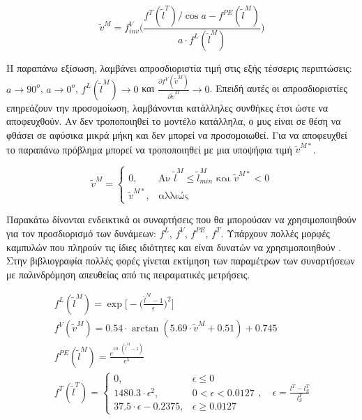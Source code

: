 \begin{equation}
    \tilde{v}^{M} = f^{V}_{inv} \bigg(\frac{f^{T}(\tilde{l}^{T})/\cos{a} - f^{PE}(\tilde{l}^{M})}{a \cdot f^{L}(\tilde{l}^{M})} \bigg)
    \label{equ:velocity-solution}
\end{equation}

Η παραπάνω εξίσωση, λαμβάνει απροσδιοριστία τιμή στις εξής τέσσερις περιπτώσεις: $a\rightarrow 90^{o}$, $a\rightarrow 0^{o}$, $f^{L}(\tilde{l}^{M})\rightarrow 0$ και $\frac{\partial f^{V}(\tilde{v}^{M})}{\partial \tilde{v}^{M}}\rightarrow 0$. Επειδή αυτές οι απροσδιοριστίες επηρεάζουν την προσομοίωση, λαμβάνονται κατάλληλες συνθήκες έτσι ώστε να αποφευχθούν. Αν δεν τροποποιηθεί το μοντέλο κατάλληλα, ο μυς είναι σε θέση να φθάσει σε αφύσικα μικρά μήκη και δεν μπορεί να προσομοιωθεί. Για να αποφευχθεί το παραπάνω πρόβλημα μπορεί να τροποποιηθεί με μια υποψήφια τιμή $\tilde{v}^{M*}$.

\begin{equation}
    \tilde{v}^{M} =
    \begin{cases}
        0, & \text{Αν } \tilde{l}^{M} \leq \tilde{l}^{M}_{min} \text{ και } \tilde{v}^{M*} < 0\\
        \tilde{v}^{M*}, & \text{αλλιώς}
    \end{cases}
    \label{equ:velocity-solution-adjustment}
\end{equation}

Παρακάτω δίνονται ενδεικτικά οι συναρτήσεις που θα μπορούσαν να χρησιμοποιηθούν για τον προσδιορισμό των δυνάμεων: $f^{L}$, $f^{V}$, $f^{PE}$, $f^{T}$. Υπάρχουν πολλές μορφές καμπυλών που πληρούν τις ίδιες ιδιότητες και είναι δυνατών να χρησιμοποιηθούν \cite{dinguo13}. Στην βιβλιογραφία πολλές φορές γίνεται εκτίμηση των παραμέτρων των συναρτήσεων με παλινδρόμηση απευθείας από τις πειραματικές μετρήσεις.

\begin{equation}
    \begin{gathered}
        f^{L}(\tilde{l}^{M}) = \exp \bigg[-\bigg( \frac{\tilde{l}^{M}-1}{\epsilon} \bigg)^{2}\bigg]\\[10pt]
        f^{V}(\tilde{v}^{M}) = 0.54 \cdot \arctan (5.69 \cdot \tilde{v}^{M} + 0.51) + 0.745\\[10pt]
        f^{PE}(\tilde{l}^{M}) = \frac{e^{10 \cdot (\tilde{l}^{M} - 1)}}{e^{5}}\\[10pt]
        f^{T}(\tilde{l}^{T}) =
        \begin{cases}
            0, & \epsilon \leq 0\\
            1480.3 \cdot \epsilon^{2}, & 0 < \epsilon < 0.0127\\
            37.5 \cdot \epsilon − 0.2375, & \epsilon \geq 0.0127
        \end{cases}
        , \quad \epsilon = \frac{l^{T} - l^{T}_{S}}{l^{T}_{S}}
    \end{gathered}
    \label{equ:force-functions}
\end{equation}

